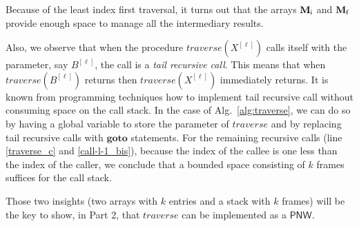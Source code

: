 \documentclass{fsttcs}
\def\pnw{\mathsf{PNW}}
\begin{document}
Because of the least index first traversal, it turns out that the arrays
\(\mathbf{M_{\sf i}}\) and \(\mathbf{M_{\sf f}}\) provide enough space to manage
all the intermediary results.

Also, we observe that when the procedure \(\mathit{traverse}(X^{[\ell]})\)
calls itself with the parameter, say $B^{[\ell]}$, the call is a \emph{tail
recursive call}. This means that when \(\mathit{traverse}(B^{[\ell]})\) returns
then \(\mathit{traverse}(X^{[\ell]})\) immediately returns.  It is known from
programming techniques how to implement tail recursive call without consuming
space on the call stack. In the case of Alg.~\ref{alg:traverse}, we can do so
by having a global variable to store the parameter of \(\mathit{traverse}\) and
by replacing tail recursive calls with \(\mathbf{goto}\) statements.  For the
remaining recursive calls (line \ref{traverse_c} and \ref{call-l-1_bis}),
because the index of the callee is one less than the index of the caller, we conclude that a bounded
space consisting of \(k\) frames suffices for the call stack.

Those two insights (two arrays with \(k\) entries and a
stack with \(k\) frames) will be the key to show, in Part 2, that
\(\mathit{traverse}\) can be implemented as a \(\pnw\).
\end{document}
